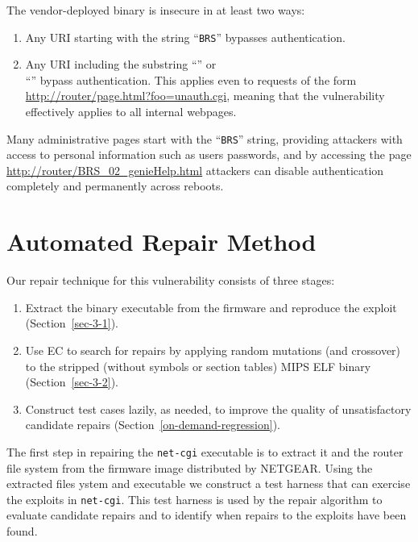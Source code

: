 \documentclass{sigcomm-alternate}
\begin{document}
The vendor-deployed binary is insecure in at least two ways: 
\begin{enumerate}
\item Any URI starting with the string ``{\tt BRS}'' bypasses authentication.

\item Any URI including the substring ``'' or\\
  ``'' bypass authentication. This applies
  even to requests of the form
  \url{http://router/page.html?foo=unauth.cgi}, meaning that the
  vulnerability effectively applies to all internal webpages.
\end{enumerate}

\noindent Many administrative pages start with the ``{\tt BRS}'' string, providing
attackers with access to personal information such as users
passwords, and by accessing the page
\url{http://router/BRS_02_genieHelp.html} attackers can
disable authentication completely and permanently
across reboots.

\section{Automated Repair Method}
\label{sec-3}

Our repair technique for this vulnerability consists of three stages:
\begin{enumerate}
\item Extract the binary executable from the firmware and reproduce
the exploit (Section~\ref{sec-3-1}).
\item Use EC to search for repairs by applying random mutations (and crossover)
  to the stripped (without symbols or section tables) MIPS ELF binary
  (Section~\ref{sec-3-2}).
\item Construct test cases lazily, as needed, to improve the quality of
unsatisfactory candidate repairs (Section~\ref{on-demand-regression}). 
\end{enumerate} 

The first step in repairing the \texttt{net-cgi} executable is to extract
it and the router file system from the firmware image distributed by
NETGEAR.  Using the extracted files ystem and executable we construct a test
harness that can exercise the exploits in \texttt{net-cgi}.  This test harness
is used by the repair algorithm to evaluate candidate repairs and to
identify when repairs to the exploits have been found.
\end{document}
